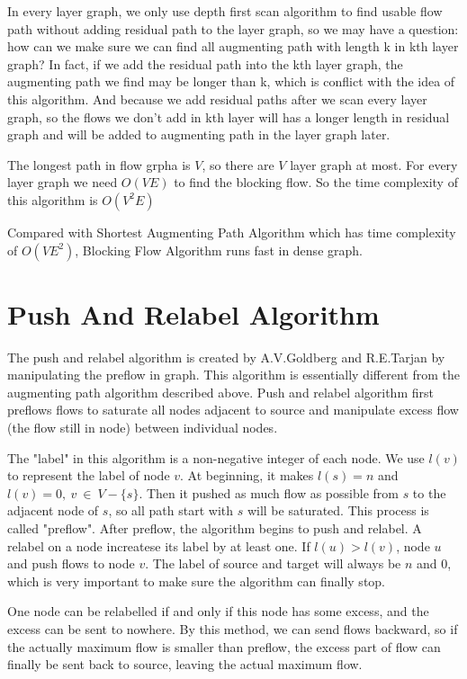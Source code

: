 \documentclass[twocolumn,9pt]{extarticle}
\begin{document}
In every layer graph, we only use depth first scan algorithm to find usable flow path without adding residual path to the layer graph, so we may have a question: how can we make sure we can find all augmenting path with length k in kth layer graph? In fact, if we add the residual path into the kth layer graph, the augmenting path we find may be longer than k, which is conflict with the idea of this algorithm. And because we add residual paths after we scan every layer graph, so the flows we don't add in kth layer will has a longer length in residual graph and will be added to augmenting path in the layer graph later.

The longest path in flow grpha is $V$, so there are $V$ layer graph at most. For every layer graph we need $O(VE)$ to find the blocking flow. So the time complexity of this algorithm is $O(V^2E)$

Compared with Shortest Augmenting Path Algorithm which has time complexity of $O(VE^2)$, Blocking Flow Algorithm runs fast in dense graph.

\section{Push And Relabel Algorithm}
The push and relabel algorithm is created by A.V.Goldberg and R.E.Tarjan by manipulating the preflow in graph.
This algorithm is essentially different from the augmenting path algorithm described above. Push and relabel algorithm first preflows flows to saturate all nodes adjacent to source and manipulate excess flow (the flow still in node) between individual nodes.

The "label" in this algorithm is a non-negative integer of each node. We use $l(v)$ to represent the label of node $v$. At beginning, it makes $l(s)=n$ and $l(v)=0,\ v\ \in\ V-\{s\}$. Then it pushed as much flow as possible from $s$ to the adjacent node of $s$, so all path start with $s$ will be saturated. This process is called "preflow". After preflow, the algorithm begins to push and relabel. A relabel on a node increatese its label by at least one. If $l(u) > l(v)$, node $u$ and push flows to node $v$. The label of source and target will always be $n$ and $0$, which is very important to make sure the algorithm can finally stop.

One node can be relabelled if and only if this node has some excess, and the excess can be sent to nowhere. By this method, we can send flows backward, so if the actually maximum flow is smaller than preflow, the excess part of flow can finally be sent back to source, leaving the actual maximum flow.
\end{document}
